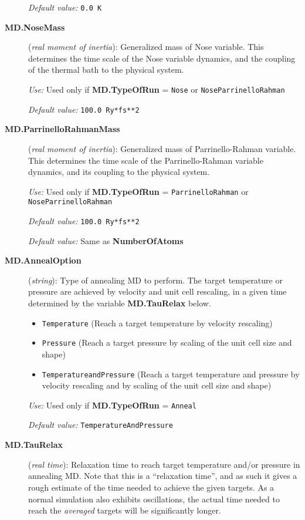 \documentclass[11pt]{article}
\begin{document}
\begin{description}
{\it Default value:} {\tt 0.0 K}



\item[{\bf MD.NoseMass}] ({\it real moment of inertia}): 
Generalized mass of Nose variable.
This determines the time scale of the Nose variable
dynamics, and the coupling of the thermal bath to
the physical system.

{\it Use:} Used only if {\bf MD.TypeOfRun} = {\tt Nose} or 
{\tt NoseParrinelloRahman}

{\it Default value:} {\tt 100.0 Ry*fs**2}

\item[{\bf MD.ParrinelloRahmanMass}] ({\it real moment of inertia}): 
Generalized mass of Parrinello-Rahman variable.
This determines the time scale 
of the Parrinello-Rahman variable
dynamics, and its coupling to
the physical system.

{\it Use:} Used only if {\bf MD.TypeOfRun} = {\tt ParrinelloRahman} 
or {\tt NoseParrinelloRahman}

{\it Default value:} {\tt 100.0 Ry*fs**2}


{\it Default value:}  Same as {\bf NumberOfAtoms}

\item[{\bf MD.AnnealOption}] ({\it string}): 
Type of annealing MD to perform. The target temperature or pressure are
achieved by velocity and unit cell rescaling, 
in a given time determined by the variable
{\bf MD.TauRelax} below.
\begin{itemize}
\item {\tt Temperature} (Reach a target temperature by velocity rescaling)
\item {\tt Pressure} (Reach a target pressure by scaling of the unit
cell size and shape)
\item {\tt TemperatureandPressure}  (Reach a target temperature 
and pressure by velocity rescaling and by scaling of the unit
cell size and shape)
\end{itemize}

{\it Use:} Used only if {\bf MD.TypeOfRun} = {\tt Anneal}

{\it Default value:} {\tt TemperatureAndPressure}

\item[{\bf MD.TauRelax}] ({\it real time}): 
Relaxation time to reach target temperature
and/or pressure in annealing MD. Note that this is a ``relaxation
time'', and as such it gives a rough estimate of the time needed to
achieve the given targets. As a normal simulation also exhibits
oscillations, the actual time needed to reach the {\it averaged}
targets will be significantly longer.


\end{description}
\end{document}
